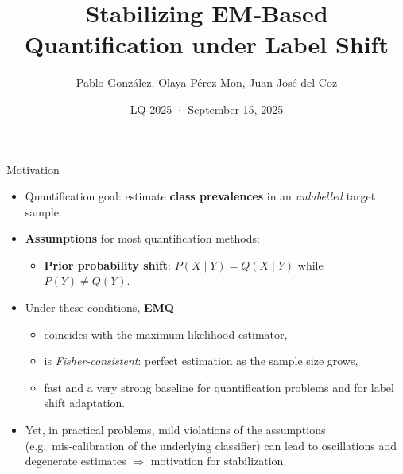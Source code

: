 \documentclass[aspectratio=169]{beamer}
\title[Stabilizing EM‑Based Quantification]{Stabilizing EM‑Based Quantification under Label Shift}
\author{Pablo González, Olaya Pérez-Mon, Juan José del Coz}
\institute[AI Center, Uni. Oviedo]{Artificial Intelligence Center\\University of Oviedo}
\date{LQ 2025 · September 15, 2025}
\begin{document}
\begin{frame}
  \titlepage
\end{frame}

\begin{frame}{Motivation}
  \begin{itemize}
    \item \alert{Quantification goal}: estimate \textbf{class prevalences} in an \emph{unlabelled} target sample.
    \item \textbf{Assumptions} for most quantification methods:
          \begin{itemize}
            \item \textbf{Prior probability shift}: $P(X\mid Y)=Q(X\mid Y)$ while $P(Y)\neq Q(Y)$.
          \end{itemize}
    \item Under these conditions,  \textbf{EMQ}
          \begin{itemize}
            \item coincides with the maximum‑likelihood estimator,
            \item is \emph{Fisher‑consistent}: perfect estimation as the sample size grows,
            \item fast and a very strong baseline for quantification problems and for label shift adaptation.
          \end{itemize}
    \item Yet, in practical problems, mild violations of the assumptions (e.g.\ mis‑calibration of the underlying classifier) can lead to oscillations and degenerate estimates $\Rightarrow$ motivation for stabilization.
  \end{itemize}
\end{frame}
\end{document}
